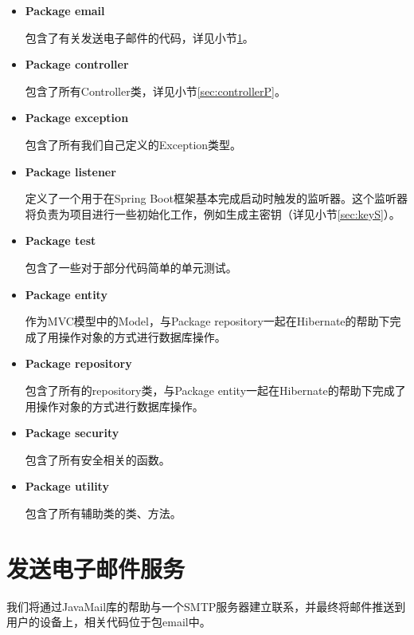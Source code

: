 \begin{itemize}

	\item \textbf{Package email}
	
	包含了有关发送电子邮件的代码，详见小节\ref{sec:emailP}。
	
	\item \textbf{Package controller}
	
	包含了所有Controller类，详见小节\ref{sec:controllerP}。
	
	\item \textbf{Package exception}
	
	包含了所有我们自己定义的Exception类型。
	
	\item \textbf{Package listener}
	
	定义了一个用于在Spring Boot框架基本完成启动时触发的监听器。这个监听器将负责为项目进行一些初始化工作，例如生成主密钥（详见小节\ref{sec:keyS}）。
	
	\item \textbf{Package test}
	
	包含了一些对于部分代码简单的单元测试。
	
	\item \textbf{Package entity}
	
	作为MVC模型中的Model，与Package repository一起在Hibernate的帮助下完成了用操作对象的方式进行数据库操作。
	
	\item \textbf{Package repository}
	
	包含了所有的repository类，与Package entity一起在Hibernate的帮助下完成了用操作对象的方式进行数据库操作。
	
	\item \textbf{Package security}
	
	包含了所有安全相关的函数。
	
	\item \textbf{Package utility}
	
	包含了所有辅助类的类、方法。

\end{itemize}

\section{发送电子邮件服务}\label{sec:emailP}

我们将通过JavaMail库的帮助与一个SMTP服务器建立联系，并最终将邮件推送到用户的设备上，相关代码位于包email中。

